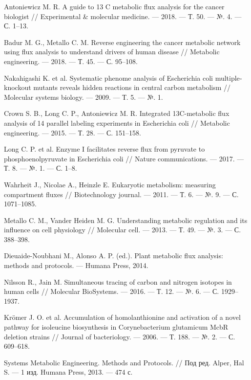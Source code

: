 \documentclass[14pt, a4paper]{extreport}
\begin{document}
\begin{thebibliography}{XXXX}
	Antoniewicz M. R. A guide to 13 C metabolic flux analysis for the cancer biologist // Experimental \& molecular medicine. --- 2018. --- Т. 50. --- №. 4. --- С. 1--13.
	
	Badur M. G., Metallo C. M. Reverse engineering the cancer metabolic network using flux analysis to understand drivers of human disease // Metabolic engineering. --- 2018. --- Т. 45. --- С. 95--108.
	
	Nakahigashi K. et al. Systematic phenome analysis of Escherichia coli multiple‐knockout mutants reveals hidden reactions in central carbon metabolism // Molecular systems biology. --- 2009. --- Т. 5. --- №. 1.
	
	Crown S. B., Long C. P., Antoniewicz M. R. Integrated 13C-metabolic flux analysis of 14 parallel labeling experiments in Escherichia coli // Metabolic engineering. --- 2015. --- Т. 28. --- С. 151--158.
	
	Long C. P. et al. Enzyme I facilitates reverse flux from pyruvate to phosphoenolpyruvate in Escherichia coli // Nature communications. --- 2017. --- Т. 8. --- №. 1. --- С. 1--8.
	
	Wahrheit J., Nicolae A., Heinzle E. Eukaryotic metabolism: measuring compartment fluxes // Biotechnology journal. --- 2011. --- Т. 6. --- №. 9. --- С. 1071--1085.
	
	Metallo C. M., Vander Heiden M. G. Understanding metabolic regulation and its influence on cell physiology // Molecular cell. --- 2013. --- Т. 49. --- №. 3. --- С. 388--398.
	
	Dieuaide-Noubhani M., Alonso A. P. (ed.). Plant metabolic flux analysis: methods and protocols. --- Humana Press, 2014.
	
	Nilsson R., Jain M. Simultaneous tracing of carbon and nitrogen isotopes in human cells // Molecular BioSystems. --- 2016. --- Т. 12. --- №. 6. --- С. 1929--1937.
	
	Krömer J. O. et al. Accumulation of homolanthionine and activation of a novel pathway for isoleucine biosynthesis in Corynebacterium glutamicum McbR deletion strains // Journal of bacteriology. --- 2006. --- Т. 188. --- №. 2. --- С. 609--618.
	
	Systems Metabolic Engineering. Methods and Protocols. // Под ред. Alper, Hal S. --- 1 изд. Humana Press, 2013. --- 474 с.
	

\end{thebibliography}
\end{document}
